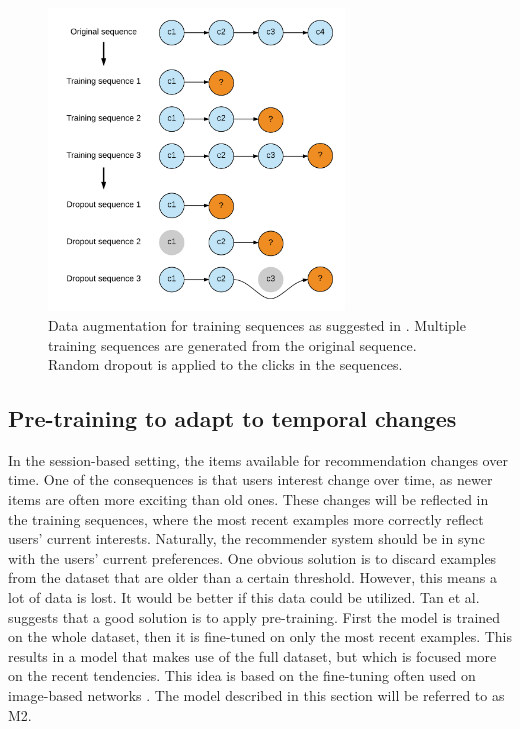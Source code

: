 \begin{figure}[htp]
	\centering
	\includegraphics[width=0.7\textwidth]{fig/sequence-augmentation.png}
	\caption{Data augmentation for training sequences as suggested in \cite{DBLP:journals/corr/TanXL16}. Multiple training sequences are generated from the original sequence. Random dropout is applied to the clicks in the sequences.}
	\label{fig:sequence-augmentation}
\end{figure}

\subsection{Pre-training to adapt to temporal changes}
In the session-based setting, the items available for recommendation changes over time. One of the consequences is that users interest change over time, as newer items are often more exciting than old ones. These changes will be reflected in the training sequences, where the most recent examples more correctly reflect users' current interests. Naturally, the recommender system should be in sync with the users' current preferences. One obvious solution is to discard examples from the dataset that are older than a certain threshold. However, this means a lot of data is lost. It would be better if this data could be utilized. Tan et al. suggests that a good solution is to apply pre-training. First the model is trained on the whole dataset, then it is fine-tuned on only the most recent examples. This results in a model that makes use of the full dataset, but which is focused more on the recent tendencies. This idea is based on the fine-tuning often used on image-based networks \cite{DBLP:journals/corr/ChatfieldSVZ14}. The model described in this section will be referred to as M2.

